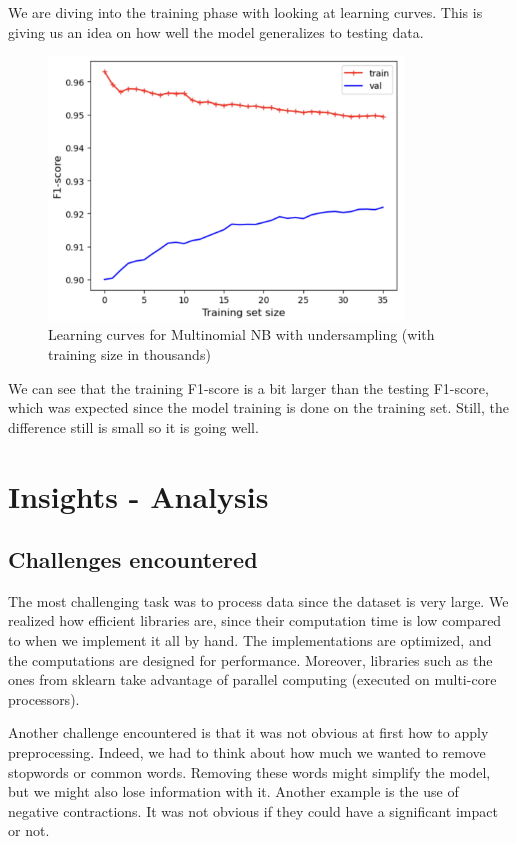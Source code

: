 \documentclass{article}
\begin{document}
We are diving into the training phase with looking at learning curves. This is giving us an idea on how well the model generalizes to testing data.

\begin{figure}[H]
  \centering
  \includegraphics[height=7cm]{nb_start_learning_curves.png}
  \caption{Learning curves for Multinomial NB with undersampling (with training size in thousands)}
  \label{fig:image_label}
\end{figure}

We can see that the training F1-score is a bit larger than the testing F1-score, which was expected since the model training is done on the training set. Still, the difference still is small so it is going well. 

\section{Insights - Analysis}

\subsection{Challenges encountered}

The most challenging task was to process data since the dataset is very large. We realized how efficient libraries are, since their computation time is low compared to when we implement it all by hand.
The implementations are optimized, and the computations are designed for performance. Moreover, libraries such as the ones from sklearn take advantage of parallel computing (executed on multi-core processors). 

Another challenge encountered is that it was not obvious at first how to apply preprocessing. Indeed, we had to think about how much we wanted to remove stopwords or common words. Removing these words might simplify the model, but we might also lose information with it. Another example is the use of negative contractions. It was not obvious if they could have a significant impact or not.
\end{document}
